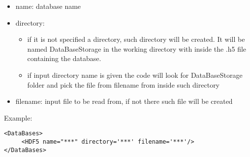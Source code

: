 \begin{itemize}
\item name: database name
\item directory:
\begin{itemize}
\item if it is not specified a directory, such directory will be created. It will be named DataBaseStorage in the working directory with inside the .h5 file containing the database. 
\item if input directory name is given the code will look for DataBaseStorage folder and pick the file from filename from inside such directory
\end{itemize}
\item filename: input file to be read from, if not there such file will be created

\end{itemize}
Example:
\begin{lstlisting}[style=XML]
<DataBases> 
     <HDF5 name="***" directory='***' filename='***'/>  
</DataBases>   
\end{lstlisting}

